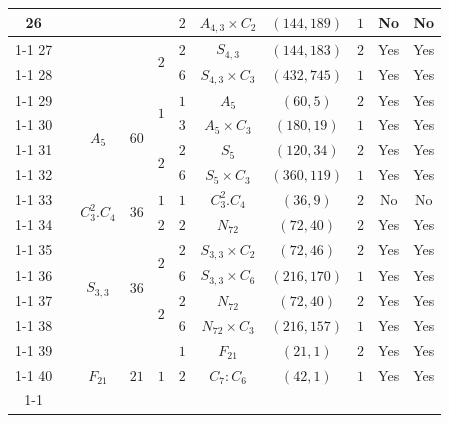 \documentclass[12pt]{amsart}
\numberwithin{equation}{section}
\theoremstyle{plain}
\theoremstyle{definition}
\theoremstyle{remark}
\begin{document}
{\begin{longtable}{|c|c|c|c|c|c|c|c|c|c|c|}
26 &  &  &  &  & $2$ & \multicolumn{1}{c|}{$A_{4,3}\times C_2$} & $(144,189)$ & $1$ & No & No \\ \cline{1-1} \cline{5-11}
27 &  &  &  & \multirow[t]{2}{*}{$2$} & $2$ & \multicolumn{1}{c|}{$S_{4,3}$} & $(144,183)$ & $2$ & Yes & Yes \\ \cline{1-1} \cline{6-11}
28 &  &  &  &  & $6$ & \multicolumn{1}{c|}{$S_{4,3}\times C_3$} & $(432,745)$ & $1$ & Yes & Yes \\ \cline{1-1} \cline{3-11}
29 &  & \multirow[t]{4}{*}{$A_5$} & \multirow[t]{4}{*}{$60$} & \multirow[t]{2}{*}{$1$} & $1$ & \multicolumn{1}{c|}{$A_5$} & $(60,5)$ & $2$ & Yes & Yes \\ \cline{1-1} \cline{6-11}
30 &  &  &  &  & $3$ & \multicolumn{1}{c|}{$A_5\times C_3$} & $(180,19)$ & $1$ & Yes & Yes \\ \cline{1-1} \cline{5-11}
31 &  &  &  & \multirow[t]{2}{*}{$2$} & $2$ & \multicolumn{1}{c|}{$S_5$} & $(120,34)$ & $2$ & Yes & Yes \\ \cline{1-1} \cline{6-11}
32 &  &  &  &  & $6$ & \multicolumn{1}{c|}{$S_5\times C_3$} & $(360,119)$ & $1$ & Yes & Yes \\ \cline{1-1} \cline{3-11}
33 &  & \multirow[t]{2}{*}{$C_3^2.C_4$} & \multirow[t]{2}{*}{$36$} & $1$ & $1$ & \multicolumn{1}{c|}{$C_3^{2}.C_4$} & $(36,9)$ & $2$ & No & No \\ \cline{1-1} \cline{5-11}
34 &  &  &  & $2$ & $2$ & \multicolumn{1}{c|}{$N_{72}$} & $(72,40)$ & $2$ & Yes & Yes \\ \cline{1-1} \cline{3-11}
35 &  & \multirow[t]{4}{*}{$S_{3,3}$} & \multirow[t]{4}{*}{$36$} & \multirow[t]{2}{*}{$2$} & $2$ & \multicolumn{1}{c|}{$S_{3,3}\times C_2$} & $(72,46)$ & $2$ & Yes & Yes \\ \cline{1-1} \cline{6-11}
36 &  &  &  &  & $6$ & \multicolumn{1}{c|}{$S_{3,3}\times C_6$} & $(216,170)$ & $1$ & Yes & Yes \\ \cline{1-1} \cline{5-11}
37 &  &  &  & \multirow[t]{2}{*}{$2$} & $2$ & \multicolumn{1}{c|}{$N_{72}$} & $(72,40)$ & $2$ & Yes & Yes \\ \cline{1-1} \cline{6-11}
38 &  &  &  &  & $6$ & \multicolumn{1}{c|}{$N_{72}\times C_3$} & $(216,157)$ & $1$ & Yes & Yes \\ \cline{1-1} \cline{3-11}
39 &  & \multirow[t]{3}{*}{$F_{21}$} & \multirow[t]{3}{*}{$21$} & \multirow[t]{3}{*}{$1$} & $1$ & \multicolumn{1}{c|}{$F_{21}$} & $(21,1)$ & $2$ & Yes & Yes \\ \cline{1-1} \cline{6-11}
40 &  &  &  &  & $2$ & \multicolumn{1}{c|}{$C_7:C_6$} & $(42,1)$ & $1$ & Yes & Yes \\ \cline{1-1} \cline{6-11}

\end{longtable}}
\end{document}
